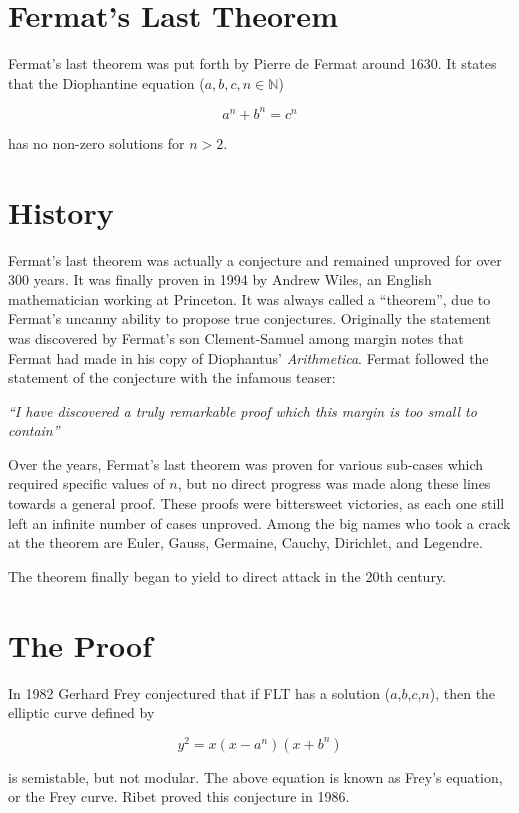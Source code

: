 \documentclass[12pt]{article}
\begin{document}
\section{Fermat's Last Theorem}

Fermat's last theorem was put forth by Pierre de Fermat around 1630.  It states that the Diophantine equation ($a, b, c, n \in \mathbb{N}$)

$$ a^n + b^n = c^n $$

has no non-zero solutions for $n>2$. 

\section{History}

Fermat's last theorem was actually a conjecture and remained unproved for over 300 years.  It was finally proven in 1994 by Andrew Wiles, an English mathematician working at Princeton.  It was always called a ``theorem'', due to Fermat's uncanny ability to propose true conjectures. Originally the statement was discovered by Fermat's son Clement-Samuel among margin notes that Fermat had made in his copy of Diophantus' \emph{Arithmetica}.  Fermat followed the statement of the conjecture with the infamous teaser:

{\it ``I have discovered a truly remarkable proof which this margin is too small to contain''}

Over the years, Fermat's last theorem was proven for various sub-cases which required specific values of $n$, but no direct progress was made along these lines towards a general proof.  These proofs were bittersweet victories, as each one still left an infinite number of cases unproved.  Among the big names who took a crack at the theorem are Euler, Gauss, Germaine, Cauchy, Dirichlet, and Legendre.  

The theorem finally began to yield to direct attack in the 20th century.

\section{The Proof}

In 1982 Gerhard Frey conjectured that if FLT has a solution ($a$,$b$,$c$,$n$), then the elliptic curve defined by

$$ y^2 = x(x-a^n)(x+b^n) $$

is semistable, but not modular.  The above equation is known as Frey's equation, or the Frey curve. Ribet proved this conjecture in 1986.
\end{document}
